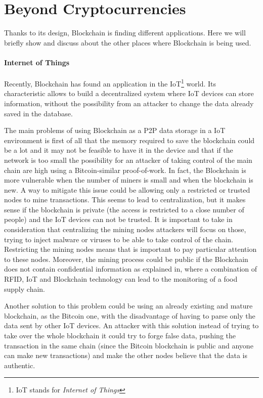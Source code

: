 \section{Beyond Cryptocurrencies}
\label{sec:beyond_crypto}

Thanks to its design, Blockchain is finding different applications. Here
we will briefly show and discuss about the other places where Blockchain
is being used.

\paragraph*{Internet of Things}

Recently, Blockchain has found an application in the IoT\footnote{IoT stands
for \textit{Internet of Things}} world\cite{politecnico16}. Its characteristic
allows to build a decentralized system where IoT devices can store information,
without the possibility from an attacker to change the data already saved in
the database\cite{politecnico16}.

The main problems of using Blockchain as a P2P data storage in a IoT environment
is first of all that the memory required to save the blockchain could be a lot
and it may not be feasible to have it in the device and that if the network is
too small the possibility for an attacker of taking control of the main chain
are high using a Bitcoin-similar proof-of-work. In fact, the Blockchain is more
vulnerable when the number of miners is small and when the blockchain is new. A
way to mitigate this issue could be allowing only a restricted or trusted nodes
to mine transactions. This seems to lead to centralization, but it makes sense
if the blockchain is private (the access is restricted to a close number of
people) and the IoT devices can not be trusted.
It is important to take in consideration that centralizing the mining nodes
attackers will focus on those, trying to inject malware or viruses to be able to
take control of the chain. Restricting the mining nodes means that is important
to pay particular attention to these nodes.
Moreover, the mining process could be public if the Blockchain does not contain
confidential information as explained in\cite{tian17}, where a combination of
RFID, IoT and Blockchain technology can lead to the monitoring of a food supply
chain.

Another solution to this problem could be using an already existing and mature
blockchain, as the Bitcoin one, with the disadvantage of having to parse only
the data sent by other IoT devices. An attacker with this solution instead of
trying to take over the whole blockchain it could try to forge false data,
pushing the transaction in the same chain (since the Bitcoin blockchain is
public and anyone can make new transactions) and make the other nodes believe
that the data is authentic.

